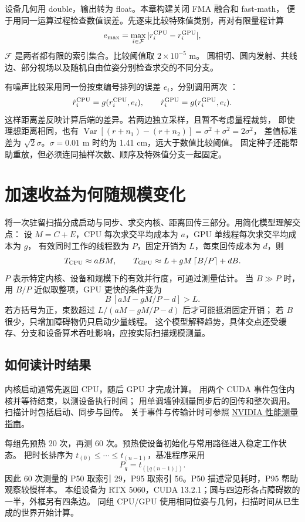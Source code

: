 设备几何用 double，输出转为 float。本章构建关闭 FMA 融合和 fast-math，
便于用同一运算过程检查数值误差。先逐束比较特殊值类别，再对有限量程计算
\[
 e_{\max}=\max_{i\in\mathcal F}|r_i^{\rm CPU}-r_i^{\rm GPU}|,
\]
$\mathcal F$ 是两者都有限的索引集合。比较阈值取 $2\times10^{-5}$ m。
圆相切、圆内发射、共线边、部分视场以及随机自由位姿分别检查求交的不同分支。

有噪声比较采用同一份按束编号排列的误差 $e_i$，分别调用两次 ：
\[
 \tilde r_i^{\rm CPU}=g(r_i^{\rm CPU},e_i),\qquad
 \tilde r_i^{\rm GPU}=g(r_i^{\rm GPU},e_i).
\]
这样距离差反映计算后端的差异。若两边独立采样，且暂不考虑量程裁剪，
即使理想距离相同，也有
$\operatorname{Var}[(r+n_1)-(r+n_2)]=\sigma^2+\sigma^2=2\sigma^2$，
差值标准差为 $\sqrt2\sigma$。$\sigma=0.01$ m 时约为 1.41 cm，远大于数值比较阈值。
固定种子还能帮助重放，但必须连同抽样次数、顺序及特殊值分支一起固定。

\section{加速收益为何随规模变化}
将一次驻留扫描分成启动与同步、求交内核、距离回传三部分。用简化模型理解交点：
设 $M=C+E$，CPU 每次求交平均成本为 $a$，GPU 单线程每次求交平均成本为 $g$，
有效同时工作的线程数为 $P$，固定开销为 $L$，每束回传成本为 $d$，则
\[
 T_{\rm CPU}\approx aBM,\qquad
 T_{\rm GPU}\approx L+gM\left\lceil B/P\right\rceil+dB.
\]
$P$ 表示特定内核、设备和规模下的有效并行度，可通过测量估计。
当 $B\gg P$ 时，用 $B/P$ 近似取整项，GPU 更快的条件变为
\[
 B\,[aM-gM/P-d]>L.
\]
若方括号为正，束数超过 $L/(aM-gM/P-d)$ 后才可能抵消固定开销；
若 $B$ 很少，只增加障碍物仍只启动少量线程。
这个模型解释趋势，具体交点还受缓存、分支和设备算术吞吐影响，应按实际扫描规模测量。

\subsection{如何读计时结果}
内核启动通常先返回 CPU，随后 GPU 才完成计算。
 用两个 CUDA 事件包住内核并等待结束，以测设备执行时间；
用单调墙钟测量同步后的回传和整次调用。扫描计时包括启动、同步与回传。
关于事件与传输计时可参照
\href{https://docs.nvidia.com/cuda/cuda-c-best-practices-guide/index.html}{NVIDIA 性能测量指南}。

每组先预热 20 次，再测 60 次。预热使设备初始化与常用路径进入稳定工作状态。
把时长排序为 $t_{(0)}\le\cdots\le t_{(n-1)}$，基准程序采用
\[
 P_q=t_{(\lfloor q(n-1)\rfloor)}.
\]
因此 60 次测量的 P50 取索引 29，P95 取索引 56。P50 描述常见耗时，P95 帮助观察较慢样本。
本组设备为 RTX 5060，CUDA 13.2.1；圆与四边形各占障碍数的一半，外框另有四条边。
同组 CPU/GPU 使用相同位姿与几何，扫描时间从已生成的世界开始计算。

